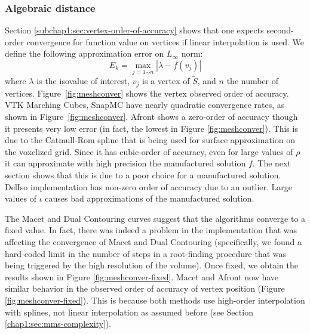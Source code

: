 \subsubsection{Algebraic distance}

Section \ref{subchap1:sec:vertex-order-of-accuracy} shows that one expects second-order 
convergence for function value on vertices if linear interpolation is used. 
We define the following approximation error on $L_\infty$ norm:
\begin{equation}
E_{k} = \max_{j=1\cdots n}|\lambda - f(v_{j})|
\label{eq:surferror}
\end{equation}
where $\lambda$ is the isovalue of interest, $v_j$ is a vertex of $\tilde{S}$, and 
$n$ the number of vertices. Figure~\ref{fig:meshconver} shows the vertex observed 
order of accuracy.
VTK Marching Cubes, SnapMC have nearly quadratic convergence rates, 
as shown in Figure~\ref{fig:meshconver}. Afront shows a zero-order of accuracy 
though it presents very low error (in fact, the lowest in Figure \ref{fig:meshconver}). 
This is due to the Catmull-Rom spline that is being used for surface 
approximation on the voxelized grid. Since it has cubic-order of accuracy, 
even for large values of $\rho$  it can approximate with high precision 
the manufactured solution $f$. The next section shows that this is due to a poor 
choice for a manufactured solution. DelIso implementation has non-zero order 
of accuracy due to an outlier. Large values of $\iota$ causes bad approximations 
of the manufactured solution.

The Macet and Dual Contouring curves suggest that the algorithms converge to 
a fixed value. 
%
In fact, there was indeed a problem in the implementation
that was affecting the convergence of Macet and Dual Contouring
(specifically, we found a hard-coded limit in the number of steps in a
root-finding procedure that was being triggered by the high resolution
of the volume). Once fixed, we obtain the results shown in Figure
\ref{fig:meshconver-fixed}. Macet and Afront now have similar behavior 
in the observed order of accuracy of vertex position 
(Figure \ref{fig:meshconver-fixed}). This is because both methods use 
high-order interpolation with splines, not linear interpolation as 
assumed before (see Section \ref{chap1:sec:mms-complexity}).

